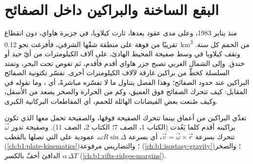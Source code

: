 \chapter{البقع الساخنة والبراكين داخل الصفائح}\label{ch:b1:hotspots}

منذ يناير 1983، وعلى مدى عقود بعدها، ثارت كيلاويا، في جزيرة هاواي، دون انقطاع تقريبًا من فوهة على منطقة شقّها الشرقي، فأفرغت نحو \qty{0.12}{km^3} من الحمم كل سنة. وتقف كيلاويا في وسط صفيحة المحيط الهادئ، على آلاف الكيلومترات من أيّ حيد أو خندق. وإلى الشمال الغربي تصبح جزر هاواي أقدم فأقدم، ثم تغوص تحت البحر، وتمتد السلسلة كخطّ من براكين غارقة لآلاف الكيلومترات أخرى. تفسّر تكتونية الصفائح البراكين عند حدود الصفائح؛ وهذا الفصل يتناول ما لا تفسّره مباشرةً، أي ، وما تقوله في المقابل: كيف تتحرك الصفائح فوق  العميق، وكم من الحرارة والصخر يصعد من الأسفل، وكيف صُنعت بعض الفيضانات الهائلة للحمم، أي المقاطعات البركانية الكبرى.

\begin{recall}
 تغذّي البراكين من أعماق  بينما تتحرك الصفيحة فوقها، والصفيحة تحمل معها  الذي تكون براكينه أقدم كلما بَعُدت (الكتاب 1، الصف 7؛ الكتاب 2، الصف 11). وصفيحة تدور  $\vec\omega$ تتحرك بسرعة $\vec v = \vec\omega\times\vec r$، أي بسرعة $\omega R\sin\Delta$، عمودية على  التي تصلها بالقطب (\cref{ch:b1:plate-kinematics})؛ والتضاريس مرفوعة  (\cref{ch:b1:isostasy-gravity})؛ والصخر الدافئ أخفّ بالكسر $\alpha\,\Delta T$ (\cref{ch:b1:rifts-ridges-margins}).
\end{recall}

